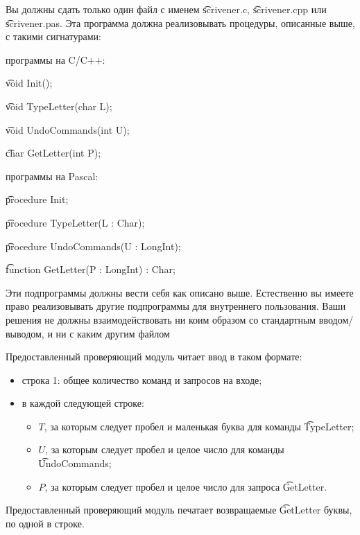 Вы должны сдать только один файл с именем \t{scrivener.c}, \t{scrivener.cpp} или \t{scrivener.pas}. Эта программа должна реализовывать процедуры, описанные выше, с такими сигнатурами:

программы на C/C++:

\t{void Init();}

\t{void TypeLetter(char L);}

\t{void UndoCommands(int U);}

\t{char GetLetter(int P);}

программы на Pascal:

\t{procedure Init;}

\t{procedure TypeLetter(L : Char);}

\t{procedure UndoCommands(U : LongInt);}

\t{function GetLetter(P : LongInt) : Char;}

Эти подпрограммы должны вести себя как описано выше. Естественно вы имеете право реализовывать другие подпрограммы для внутреннего пользования. Ваши решения не должны взаимодействовать ни коим образом со стандартным вводом/выводом, и ни с каким другим файлом

Предоставленный проверяющий модуль читает ввод в таком формате:

\begin{itemize}
\item строка 1: общее количество команд и запросов на входе;
\item в каждой следующей строке:
\begin{itemize}
\item $T$, за которым следует пробел и маленькая буква для команды \t{TypeLetter};
\item $U$, за которым следует пробел и целое число для команды \t{UndoCommands};
\item $P$, за которым следует пробел и целое число для запроса \t{GetLetter}.
\end{itemize}
\end{itemize}

Предоставленный проверяющий модуль печатает возвращаемые \t{GetLetter} буквы, по
одной в строке.
